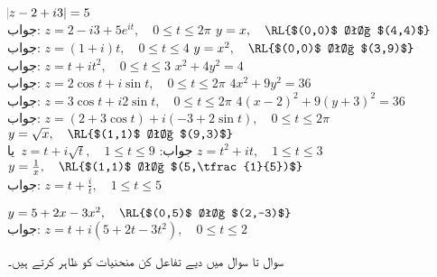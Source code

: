 \quad
$\abs{z-2+i3}=5$\\
جواب:\quad
$z=2-i3+5e^{it},\quad 0\le t\le 2\pi$
\quad
$y=x,\quad \text{\RL{$(0,0)$ تا $(4,4)$}}$\\
جواب:\quad
$z=(1+i)t,\quad 0\le t\le 4$
\quad
$y=x^2,\quad \text{\RL{$(0,0)$ تا $(3,9)$}}$\\
جواب:\quad
$z=t+it^2,\quad 0\le t\le 3$
\quad
$x^2+4y^2=4$\\
جواب:\quad
$z=2\cos t+i\sin t,\quad 0\le t\le 2\pi$
\quad
$4x^2+9y^2=36$\\
جواب:\quad
$z=3\cos t+i2\sin t,\quad 0\le t\le 2\pi$
\quad
$4(x-2)^2+9(y+3)^2=36$\\
جواب:\quad
$z=(2+3\cos t)+i(-3+2\sin t),\quad 0\le t\le 2\pi$
\quad
$y=\sqrt{x},\quad \text{\RL{$(1,1)$ تا $(9,3)$}}$\\
جواب:\quad
$\,z=t+i\sqrt{t},\quad 1\le t\le 9$
یا
$z=t^2+it,\quad 1\le t\le 3\,$
\quad
$y=\tfrac{1}{x},\quad \text{\RL{$(1,1)$ تا $(5,\tfrac{1}{5})$}}$\\
جواب:\quad
$z=t+\tfrac{i}{t},\quad 1\le t\le 5$

\quad
$y=5+2x-3x^2,\quad \text{\RL{$(0,5)$ تا $(2,-3)$}}$\\
جواب:\quad
$z=t+i(5+2t-3t^2),\quad 0\le t\le 2$

سوال  تا سوال  میں دیے تفاعل کن منحنیات کو ظاہر کرتے ہیں۔ 

